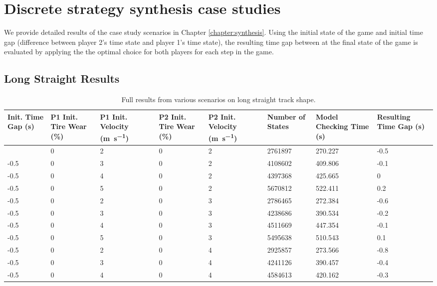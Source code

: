 \chapter{Discrete strategy synthesis case studies}
\label{app:disc_results}
\noindent We provide detailed results of the case study scenarios in Chapter \ref{chapter:synthesis}. Using the initial state of the game and initial time gap (difference between player 2's time state and player 1's time state), the resulting time gap between at the final state of the game is evaluated by applying the the optimal choice for both players for each step in the game. 
\section{Long Straight Results}
    \begin{longtable}{|p{1.4cm}|p{1.4cm}|p{1.4cm}|p{1.4cm}|p{1.4cm}|p{1.4cm}|p{1.4cm}|p{1.5cm}|}
    \hline
        Init. Time Gap (\si{\second}) & P1 Init. Tire Wear (\%) & P1 Init. Velocity (\si{\meter\per\second}) & P2 Init. Tire Wear (\%) & P2 Init. Velocity (\si{\meter\per\second}) & Number of States & Model Checking Time (\si{\second}) & Resulting Time Gap (\si{\second}) \\ \hline
        \endhead
        \addlinespace
\caption{Full results from various scenarios on long straight track shape.}
\endlastfoot
        -0.5 & 0 & 2 & 0 & 2 & 2761897 & 270.227 & -0.5 \\ \hline
        -0.5 & 0 & 3 & 0 & 2 & 4108602 & 409.806 & -0.1 \\ \hline
        -0.5 & 0 & 4 & 0 & 2 & 4397368 & 425.665 & 0 \\ \hline
        -0.5 & 0 & 5 & 0 & 2 & 5670812 & 522.411 & 0.2 \\ \hline
        -0.5 & 0 & 2 & 0 & 3 & 2786465 & 272.384 & -0.6 \\ \hline
        -0.5 & 0 & 3 & 0 & 3 & 4238686 & 390.534 & -0.2 \\ \hline
        -0.5 & 0 & 4 & 0 & 3 & 4511669 & 447.354 & -0.1 \\ \hline
        -0.5 & 0 & 5 & 0 & 3 & 5495638 & 510.543 & 0.1 \\ \hline
        -0.5 & 0 & 2 & 0 & 4 & 2925857 & 273.566 & -0.8 \\ \hline
        -0.5 & 0 & 3 & 0 & 4 & 4241126 & 390.457 & -0.4 \\ \hline
        -0.5 & 0 & 4 & 0 & 4 & 4584613 & 420.162 & -0.3 \\ \hline

\end{longtable}
